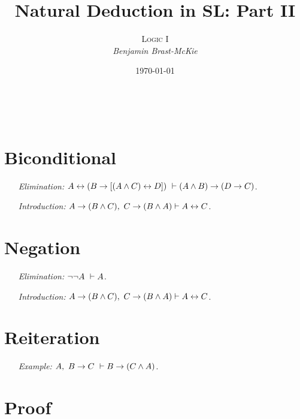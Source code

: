 \documentclass[a4paper, 11pt]{article} %
\title{\textbf{Natural Deduction in SL: Part II}} %
\author{\textsc{Logic I}\\ \em Benjamin Brast-McKie} %
\date{\today} %
\makeatletter
\renewcommand{\maketitle}{
\begin{flushright}
{\LARGE\@title}

\vspace{10pt}

{\@author}
\\ \@date
\end{flushright}

\vspace{20pt}

}
\makeatother
\begin{document}
\maketitle %

\thispagestyle{empty}


\section*{Biconditional}

\begin{enumerate}
  \item[\it Elimination:] $A \leftrightarrow (B \rightarrow [(A \wedge C)\leftrightarrow D])\ \vdash (A\wedge B) \rightarrow (D \rightarrow C)$. 
  \item[\it Introduction:] $A \rightarrow (B \wedge C),\ C \rightarrow (B \wedge A) \vdash A \leftrightarrow C$.
\end{enumerate}






\section*{Negation}

\begin{enumerate}
  \item[\it Elimination:] $\neg\neg A\ \vdash A$. 
  \item[\it Introduction:] $A \rightarrow (B \wedge C),\ C \rightarrow (B \wedge A) \vdash A \leftrightarrow C$.
\end{enumerate}


\section*{Reiteration}

\begin{enumerate}
  \item[\it Example:] $A,\ B \rightarrow C\ \vdash B \rightarrow (C \wedge A)$.
\end{enumerate}





\section*{Proof}
\end{document}
